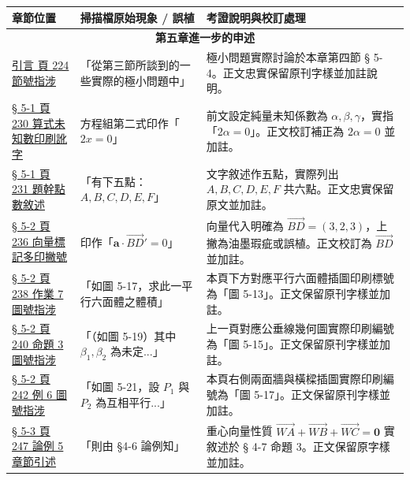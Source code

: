\documentclass[a4paper,12pt,twoside]{article}
\begin{document}
\begin{table}[H]
\centering
\small
\renewcommand{\arraystretch}{1.35}
\begin{tabularx}{\textwidth}{|p{3.2cm}|p{3.8cm}|X|}
\hline
\textbf{章節位置} & \textbf{掃描檔原始現象 / 誤植} & \textbf{考證說明與校訂處理} \\ \hline

\multicolumn{3}{|c|}{\textbf{第五章\quad 進一步的申述}} \\ \hline

\hyperref[note:b3-ch5-p224-sec-ref]{引言 頁 224 節號指涉} & 
「從第三節所談到的一些實際的極小問題中」 & 
極小問題實際討論於本章第四節 § 5-4。正文忠實保留原刊字樣並加註說明。 \\ \hline

\hyperref[note:b3-ch5-p230-2alpha-typo]{§ 5-1 頁 230 算式未知數印刷訛字} & 
方程組第二式印作「$2x = 0$」 & 
前文設定純量未知係數為 $\alpha, \beta, \gamma$，實指「$2\alpha = 0$」。正文校訂補正為 $2\alpha = 0$ 並加註。 \\ \hline

\hyperref[note:b3-ch5-p231-ex3-points]{§ 5-1 頁 231 題幹點數敘述} & 
「有下五點：$A, B, C, D, E, F$」 & 
文字敘述作五點，實際列出 $A, B, C, D, E, F$ 共六點。正文忠實保留原文並加註。 \\ \hline

\hyperref[note:b3-ch5-p236-bd-prime]{§ 5-2 頁 236 向量標記多印撇號} & 
印作「$\mathbf{a} \cdot \vec{BD}' = 0$」 & 
向量代入明確為 $\vec{BD} = (3, 2, 3)$，上撇為油墨瑕疵或誤植。正文校訂為 $\vec{BD}$ 並加註。 \\ \hline

\hyperref[note:b3-ch5-p238-fig-ref]{§ 5-2 頁 238 作業 7 圖號指涉} & 
「如圖 5-17，求此一平行六面體之體積」 & 
本頁下方對應平行六面體插圖印刷標號為「圖 5-13」。正文保留原刊字樣並加註。 \\ \hline

\hyperref[note:b3-ch5-p240-fig-ref]{§ 5-2 頁 240 命題 3 圖號指涉} & 
「（如圖 5-19）其中 $\beta_1, \beta_2$ 為未定...」 & 
上一頁對應公垂線幾何圖實際印刷編號為「圖 5-15」。正文保留原刊字樣並加註。 \\ \hline

\hyperref[note:b3-ch5-p242-fig-ref]{§ 5-2 頁 242 例 6 圖號指涉} & 
「如圖 5-21，設 $P_1$ 與 $P_2$ 為互相平行...」 & 
本頁右側兩面牆與橫樑插圖實際印刷編號為「圖 5-17」。正文保留原刊字樣並加註。 \\ \hline

\hyperref[note:b3-ch5-p247-sec-ref]{§ 5-3 頁 247 論例 5 章節引述} & 
「則由 §4-6 論例知」 & 
重心向量性質 $\vec{WA} + \vec{WB} + \vec{WC} = \mathbf{0}$ 實敘述於 § 4-7 命題 3。正文保留原字樣並加註。 \\ \hline


\end{tabularx}
\end{table}
\end{document}

